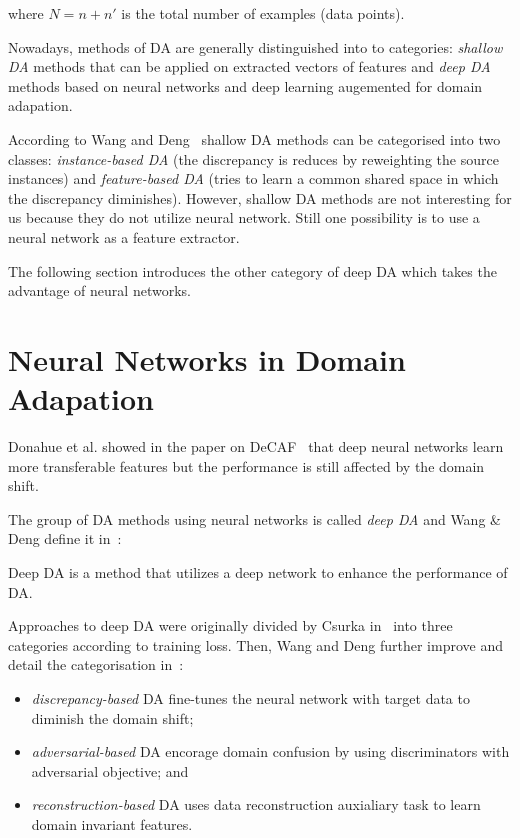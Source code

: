 where \(N = n + n'\) is the total number of examples (data points).

Nowadays, methods of DA are generally distinguished into to categories:
\textit{shallow DA} methods that can be applied on extracted vectors of features
and \textit{deep DA} methods based on neural networks and deep learning
augemented for domain adapation.~\cite{csurka2017}

According to Wang and Deng~\cite{wang2018} shallow DA methods
can be categorised into two classes:
\textit{instance-based DA}
(the discrepancy is reduces by reweighting the source instances)
and \textit{feature-based DA}
(tries to learn a common shared space in which the discrepancy diminishes).
However, shallow DA methods are not interesting for us
because they do not utilize neural network.
Still one possibility is to use a neural network as a feature extractor.~\cite{csurka2017}

The following section introduces the other category of deep DA
which takes the advantage of neural networks.

\section{Neural Networks in Domain Adapation}

Donahue et al. showed in the paper on DeCAF~\cite{donahue2014}
that deep neural networks learn more transferable features
but the performance is still affected by the domain shift.


The group of DA methods using neural networks is called \textit{deep DA}
and Wang \& Deng define it in~\cite{wang2018}:

\begin{definition}
	Deep DA is a method that utilizes a deep network to enhance the performance of DA.
\end{definition}

Approaches to deep DA were originally divided by Csurka in~\cite{csurka2017}
into three categories according to training loss.
Then, Wang and Deng further improve and detail the categorisation in~\cite{wang2018}:

\begin{itemize}
	\item \textit{discrepancy-based} DA fine-tunes the neural network
		with target data to diminish the domain shift;
	\item \textit{adversarial-based} DA encorage domain confusion
		by using discriminators with adversarial objective; and
	\item \textit{reconstruction-based} DA uses data reconstruction auxialiary task to learn domain invariant features.
\end{itemize}

